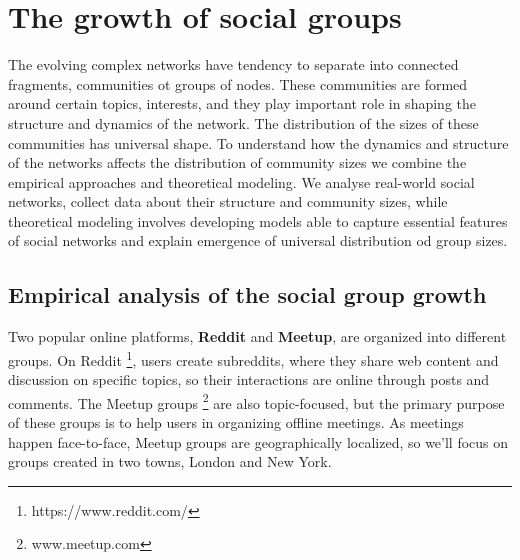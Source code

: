 \chapter{The growth of social groups}
\label{Ch:Groups}

The evolving complex networks have tendency to separate into connected fragments, communities ot groups of nodes. These communities are formed around certain topics, interests, and they play important role in shaping the structure and dynamics of the network. The distribution of the sizes of these communities has universal shape. To understand how the dynamics and structure of the networks affects the distribution of community sizes we combine the empirical approaches and theoretical modeling. We analyse real-world social networks, collect data about their structure and community sizes, while theoretical modeling involves developing models able to capture essential features of social networks and explain emergence of universal distribution od group sizes.


\section{Empirical analysis of the social group growth}

Two popular online platforms, \textbf{Reddit} and \textbf{Meetup}, are organized into different groups. On Reddit \footnote{https://www.reddit.com/}, users create subreddits, where they share web content and discussion on specific topics, so their interactions are online through posts and comments. The Meetup groups \footnote{www.meetup.com} are also topic-focused, but the primary purpose of these groups is to help users in organizing offline meetings. As meetings happen face-to-face, Meetup groups are geographically localized, so we'll focus on groups created in two towns, London and New York.  

